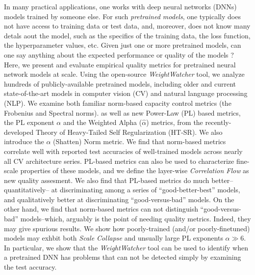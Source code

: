 
In many practical applications, one works with deep neural networks (DNNs) models trained by someone else.
For such \emph{pretrained models}, one typically does not have access to training data or test data, 
and, moreover,  does not know many detals aout the  model, such as
the specifics of the training data, the loss function, the hyperparameter values, etc.
Given just one or more pretrained models, can one say anything about the expected performance or quality of the models ?
Here, we present and evaluate empirical quality metrics for pretrained neural network models at scale.
%
Using the open-source \emph{WeightWatcher} tool, we analyze hundreds of publicly-available pretrained models, including older and current state-of-the-art models in computer vision (CV) and natural language processing (NLP).
We examine both familiar norm-based capacity control metrics (the Frobenius and  Spectral norms). as well as
new Power-Law (PL) based metrics, the PL exponent $\alpha$ and the Weighted Alpha ($\hat{\alpha}$) metrics,
from the recently-developed Theory of Heavy-Tailed Self Regularization (HT-SR).
We also introduce the $\alpha$ (Shatten) Norm metric.
We find that norm-based metrics correlate well with reported test accuracies of well-trained models
across nearly all CV architecture series.
PL-based metrics can also be used to characterize fine-scale properties of these models, and
we define the layer-wise \emph{Correlation Flow} as new quality assesment.
We also find that PL-based metrics do much better--quantitatively-- at discriminating among
a series of ``good-better-best'' models, and qualitatively better at discriminating ``good-versus-bad'' models.
On the other hand, we find that norm-based metrics can not distinguish ``good-versus-bad'' models--which, 
arguably is the point of needing quality metrics.  Indeed, they may give spurious results.
We show how poorly-trained (and/or poorly-finetuned) models may exhbit both \emph{Scale Collapse}
and unsually large PL exponents $\alpha\gg 6$.  In particular, we show that the \emph{WeightWatcher} tool
can be used to identify when a pretrained DNN has problems that can not be detected simply
by examining the test accuracy.




